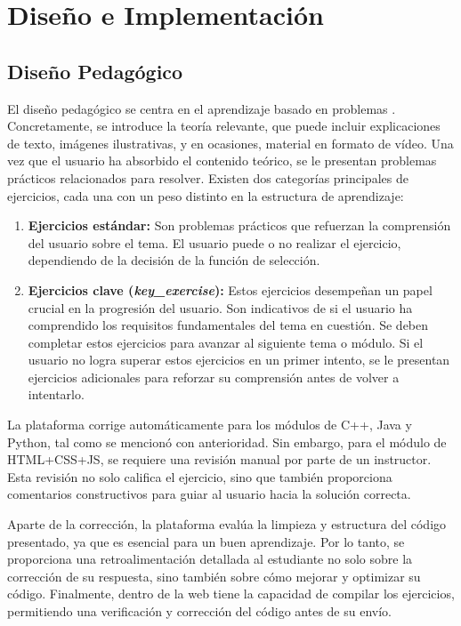 \chapter{Diseño e Implementación} \label{chap:analisisExperimentación}


\section{Diseño Pedagógico}

El diseño pedagógico se centra en el aprendizaje basado en problemas \cite{de2008aprendizaje}. Concretamente, se introduce la teoría relevante, que puede incluir explicaciones de texto, imágenes ilustrativas, y en ocasiones, material en formato de vídeo. Una vez que el usuario ha absorbido el contenido teórico, se le presentan problemas prácticos relacionados para resolver. Existen dos categorías principales de ejercicios, cada una con un peso distinto en la estructura de aprendizaje:

\begin {enumerate}
\item \textbf{Ejercicios estándar:} Son problemas prácticos que refuerzan la comprensión del usuario sobre el tema. El usuario puede o no realizar el ejercicio, dependiendo de la decisión de la función de selección. 

\item \textbf{Ejercicios clave (\textit{key\_exercise}):} Estos ejercicios desempeñan un papel crucial en la progresión del usuario. Son indicativos de si el usuario ha comprendido los requisitos fundamentales del tema en cuestión. Se deben completar estos ejercicios para avanzar al siguiente tema o módulo. Si el usuario no logra superar estos ejercicios en un primer intento, se le presentan ejercicios adicionales para reforzar su comprensión antes de volver a intentarlo.
\end{enumerate}

La plataforma corrige automáticamente para los módulos de C++, Java y Python, tal como se mencionó con anterioridad. Sin embargo, para el módulo de HTML+CSS+JS, se requiere una revisión manual por parte de un instructor. Esta revisión no solo califica el ejercicio, sino que también proporciona comentarios constructivos para guiar al usuario hacia la solución correcta.

Aparte de la corrección, la plataforma evalúa la limpieza y estructura del código presentado, ya que es esencial para un buen aprendizaje. Por lo tanto, se proporciona una retroalimentación detallada al estudiante no solo sobre la corrección de su respuesta, sino también sobre cómo mejorar y optimizar su código. Finalmente, dentro de la web tiene la capacidad de compilar los ejercicios, permitiendo una verificación y corrección del código antes de su envío.

